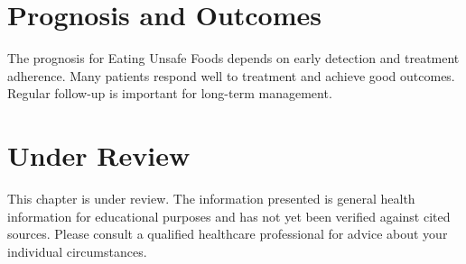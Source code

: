 \section*{Prognosis and Outcomes}
The prognosis for Eating Unsafe Foods depends on early detection and treatment adherence. Many patients respond well to treatment and achieve good outcomes. Regular follow-up is important for long-term management.
\section*{Under Review}
This chapter is under review. The information presented is general health information for educational purposes and has not yet been verified against cited sources. Please consult a qualified healthcare professional for advice about your individual circumstances.


\clearpage
